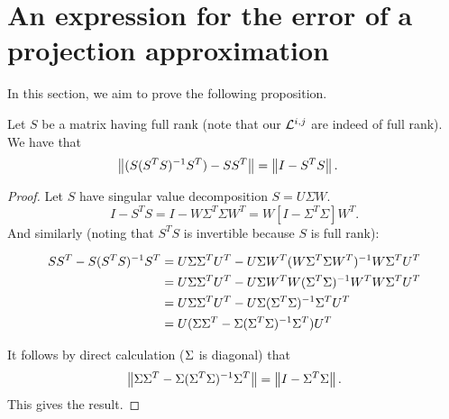 \section{An expression for the error of a projection approximation}
\label{app:proj}
In this section, we aim to prove the following proposition.

\begin{prop}{Let $S$ be a matrix having full rank (note that our $\mathcal{L}^{i,j}$ are indeed of full rank).  We have that
\[
\begin{aligned}
\left\lVert(S(S^TS)^{-1}S^T) - SS^T\right\rVert &= \left\lVert I - S^TS\right\rVert.
\end{aligned}
\]
}
\end{prop}
\begin{proof}
Let $S$ have singular value decomposition $S=U\Sigma W.$ 
\[
I - S^TS = I - W\Sigma^T\Sigma W^T = W[I - \Sigma^T\Sigma]W^T.
\]
And similarly (noting that $S^TS$ is invertible because $S$ is full rank):
\begin{widetext}
\[
\begin{aligned}
SS^T - S(S^TS)^{-1}S^T &=U\Sigma\Sigma^TU^T - U\Sigma W^T(W\Sigma^T\Sigma W^T)^{-1}W\Sigma^TU^T\\
&=U\Sigma\Sigma^TU^T - U\Sigma W^TW(\Sigma^T\Sigma)^{-1}W^TW\Sigma^TU^T\\
&=U\Sigma\Sigma^TU^T - U\Sigma(\Sigma^T\Sigma)^{-1}\Sigma^TU^T\\
& = U(\Sigma\Sigma^T - \Sigma(\Sigma^T\Sigma)^{-1}\Sigma^T)U^T\\
\end{aligned}
\]
\end{widetext}

It follows by direct calculation ($\Sigma$ is diagonal) that
\[
\left\lVert\Sigma\Sigma^T - \Sigma(\Sigma^T\Sigma)^{-1}\Sigma^T\right\rVert = \left\lVert I - \Sigma^T\Sigma\right\rVert.
\]
This gives the result.
\end{proof}